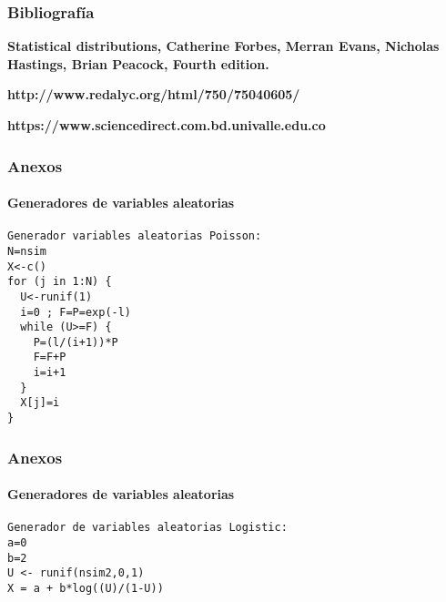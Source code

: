 \documentclass[12pt]{beamer}
\begin{document}
\begin{frame}
\frametitle{Bibliografía}
\begin{block}{\textbf {Statistical distributions, Catherine Forbes, Merran Evans, Nicholas Hastings, Brian Peacock, Fourth edition.}}
\end{block}	
\begin{block}{\textbf {http://www.redalyc.org/html/750/75040605/}}
\end{block}
\begin{block}{\textbf {https://www.sciencedirect.com.bd.univalle.edu.co}}
\end{block}
\end{frame}

\begin{frame}[fragile]
\frametitle{Anexos}
\framesubtitle{Generadores de variables aleatorias}
\begin{verbatim}
Generador variables aleatorias Poisson:
N=nsim
X<-c()
for (j in 1:N) {
  U<-runif(1)
  i=0 ; F=P=exp(-l)
  while (U>=F) {
    P=(l/(i+1))*P
    F=F+P
    i=i+1
  }
  X[j]=i
}
\end{verbatim}
\end{frame}
\begin{frame}[fragile]
\frametitle{Anexos}
\framesubtitle{Generadores de variables aleatorias}
\begin{verbatim}
Generador de variables aleatorias Logistic:
a=0
b=2
U <- runif(nsim2,0,1)
X = a + b*log((U)/(1-U))
\end{verbatim}
\end{frame}
\end{document}
